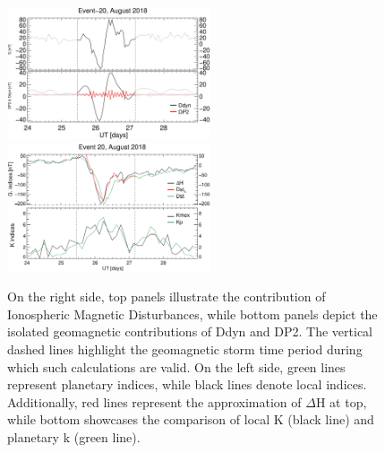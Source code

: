\documentclass[a4paper,fleqn]{cas-dc}
\begin{document}
\begin{figure}[h!]
       \centerline{\Large \bf   
      \hspace{0.275\textwidth}  \color{black}{}
       \hspace{0.295\textwidth}  \color{black}{}
         \hfill}
	\includegraphics[width=6.0cm]{images/diono/iono_PI_V1_2018-08-24.eps}	
	\includegraphics[width=6.0cm]{images/dH_approx/diono_valid_V4_2018-08-24.eps}	
	       
       \caption{On the right side, top panels illustrate the contribution of Ionospheric Magnetic Disturbances, while bottom panels depict the isolated geomagnetic contributions of Ddyn and DP2. The vertical dashed lines highlight the geomagnetic storm time period during which such calculations are valid. On the left side, green lines represent planetary indices, while black lines denote local indices. Additionally, red lines represent the approximation of $\Delta$H at top, while bottom showcases the comparison of local K (black line) and planetary k (green line).
       }
    \label{fig:iono_valid3}
\end{figure}
\end{document}
